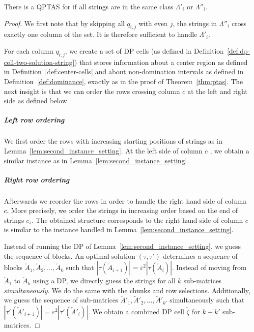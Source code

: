 \begin{lemma}\label{lem:half-length-class}
    There is a QPTAS for \GMEC if all strings are in the same class $\Lambda'_i$ or $\Lambda''_i$.
\end{lemma}
\begin{proof}
    We first note that by skipping all $q_{i,j}$ with even $j$, the strings in $\Lambda''_i$ cross exactly one column of the set.
    It is therefore sufficient to handle $\Lambda'_i$.

    For each column $q_{i,j}$, we create a set of DP cells (as defined in Definition~\ref{def:dp-cell-two-solution-string}) that stores information about a center region as defined in Definition~\ref{def:center-cells} and about non-domination intervals as defined in Definition~\ref{def:dominance}, exactly as in the proof of Theorem~\ref{thm:ptas}. 
    The next insight is that we can order the rows crossing column $c$ at the left and right side as defined below.
    \subparagraph{Left row ordering}
    We first order the rows with increasing starting positions of strings as in Lemma~\ref{lem:second_instance_setting}.
    At the left side of column $c$ , we obtain a similar instance as in Lemma~\ref{lem:second_instance_setting}.

    \subparagraph{Right row ordering}
    Afterwards we reorder the rows in order to handle the right hand side of column $c$. More precisely, we order the strings in increasing order based on the end of strings $e_i$.
    The obtained structure corresponds to the right hand side of column $c$ is similar to the instance handled in Lemma~\ref{lem:second_instance_setting}.

    Instead of running the DP of Lemma~\ref{lem:second_instance_setting}, we guess the sequence of blocks.
    An optimal solution $(\tau,\tau')$ determines a sequence of blocks $\overleftarrow{A}_1,\overleftarrow{A}_2,\dotsc,\overleftarrow{A}_k$ such that $|\tau(\overleftarrow{A}_{i+1})| =  \varepsilon^2 |\tau(\overleftarrow{A}_{i})|$. 
    Instead of moving from $\overleftarrow{A}_1$ to $\overleftarrow{A}_k$ using a DP, we directly guess the strings for all $k$ sub-matrices \emph{simultaneously}.
    We do the same with the chunks and row selections.
    Additionally, we guess the sequence of sub-matrices $\overleftarrow{A}'_1,\overleftarrow{A}'_2,\dotsc,\overleftarrow{A}'_{k'}$ simultaneously 
    such that $|\tau'(\overleftarrow{A}'_{i+1})| =  \varepsilon^2 |\tau'(\overleftarrow{A}'_{i})|$.
    We obtain a combined DP cell $\overleftarrow{\zeta}$ for $k+k'$ sub-matrices.


\end{proof}
